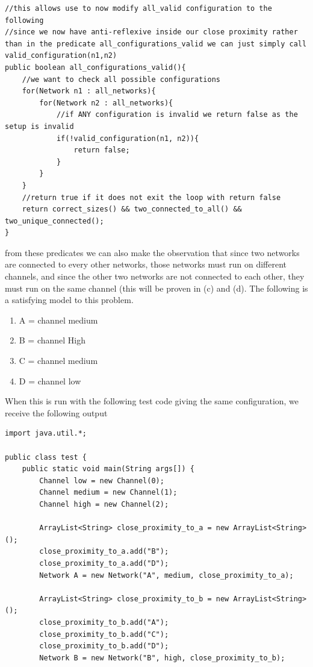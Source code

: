 \documentclass{article}
\begin{document}
\begin{enumerate}[(a)]
    \begin{lstlisting}
//this allows use to now modify all_valid configuration to the following
//since we now have anti-reflexive inside our close proximity rather than in the predicate all_configurations_valid we can just simply call valid_configuration(n1,n2)
public boolean all_configurations_valid(){
    //we want to check all possible configurations
    for(Network n1 : all_networks){
        for(Network n2 : all_networks){
            //if ANY configuration is invalid we return false as the setup is invalid
            if(!valid_configuration(n1, n2)){
                return false;
            }
        }
    }
    //return true if it does not exit the loop with return false
    return correct_sizes() && two_connected_to_all() && two_unique_connected();
}
        \end{lstlisting}
        from these predicates we can also make the observation that since two networks are connected to every other networks, those networks must run on different channels, and since the other two networks are not connected to each other, they must run on the same channel (this will be proven in (c) and (d). The following is a satisfying model to this problem. 
        \begin{enumerate}
            \item A = channel medium
            \item B = channel High
            \item C = channel medium
            \item D = channel low
        \end{enumerate}
        \newpage
        When this is run with the following test code giving the same configuration, we receive the following output
        \begin{lstlisting}
import java.util.*;

public class test {
    public static void main(String args[]) {
        Channel low = new Channel(0);
        Channel medium = new Channel(1);
        Channel high = new Channel(2);

        ArrayList<String> close_proximity_to_a = new ArrayList<String>();
        close_proximity_to_a.add("B");
        close_proximity_to_a.add("D");
        Network A = new Network("A", medium, close_proximity_to_a);

        ArrayList<String> close_proximity_to_b = new ArrayList<String>();
        close_proximity_to_b.add("A");
        close_proximity_to_b.add("C");
        close_proximity_to_b.add("D");
        Network B = new Network("B", high, close_proximity_to_b);


\end{lstlisting}
\end{enumerate}
\end{document}
